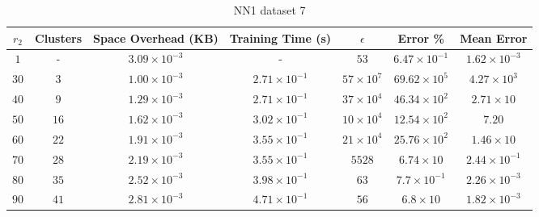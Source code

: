 \begin{adjustwidth}{-1cm}{}
\begin{table}
\caption{NN1 dataset 7}\label{ws17}
\begin{tabular}{ccccccc}
\hline
\toprule
$r_2$ & Clusters & Space Overhead (KB) & Training Time (s) & $\epsilon$ & Error \% & Mean Error\\
\midrule
$1$ & - & $3.09 \times 10^{-3}$ & - & $53$ & $6.47 \times 10^{-1}$ & $1.62 \times 10^{-3}$\\
$30$ & $3$ & $1.00 \times 10^{-3}$ & $2.71 \times 10^{-1}$ & $57 \times 10^7$ & $69.62 \times 10^5$ & $4.27 \times 10^3$\\
$40$ & $9$ & $1.29 \times 10^{-3}$ & $2.71 \times 10^{-1}$ & $37 \times 10^4$ & $46.34 \times 10^2$ & $2.71 \times 10$\\
$50$ & $16$ & $1.62 \times 10^{-3}$ & $3.02 \times 10^{-1}$ & $10 \times 10^4$ & $12.54 \times 10^2$ & $7.20$\\
$60$ & $22$ & $1.91 \times 10^{-3}$ & $3.55 \times 10^{-1}$ & $21 \times 10^4$ & $25.76 \times 10^2$ & $1.46 \times 10$\\
$70$ & $28$ & $2.19 \times 10^{-3}$ & $3.55 \times 10^{-1}$ & $5528$ & $6.74  \times 10$ & $2.44 \times 10^{-1}$\\
$80$ & $35$ & $2.52 \times 10^{-3}$ & $3.98 \times 10^{-1}$ & $63$ & $7.7 \times 10^{-1}$ & $2.26 \times 10^{-3}$\\
$90$ & $41$ & $2.81 \times 10^{-3}$ & $4.71 \times 10^{-1}$ & $56$ & $6.8  \times 10$ & $1.82 \times 10^{-3}$\\
\bottomrule
\end{tabular}
\end{table}
\end{adjustwidth}

\par\null\par
\par\null\par

